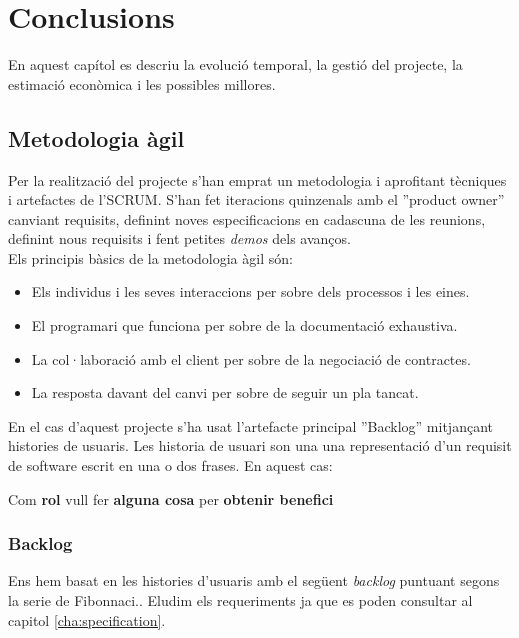 \chapter{Conclusions}
\label{cha:conclussions}

En aquest cap\'{i}tol es descriu la evolució temporal, la gestió del projecte, la estimació econòmica i les possibles millores.


\section{Metodologia àgil}
Per la realització del projecte s'han emprat un metodologia  i aprofitant tècniques i artefactes de l'SCRUM.\cite{agile} S'han fet iteracions quinzenals amb el ''product owner'' canviant requisits, definint noves especificacions en cadascuna de les reunions, definint nous requisits i fent petites \textit{demos} dels avanços.\\
Els principis bàsics de la metodologia àgil són\cite{agilemanifesto}:
\begin{itemize}
\item Els individus i les seves interaccions per sobre dels processos i les eines.
\item El programari que funciona per sobre de la documentació exhaustiva.
\item La col·laboració amb el client per sobre de la negociació de contractes.
\item La resposta davant del canvi per sobre de seguir un pla tancat.
\end{itemize}

En el cas d'aquest projecte s'ha usat l'artefacte principal ''Backlog'' mitjançant histories de usuaris. Les historia de usuari son una una representació d'un requisit de software escrit en una o dos frases. En aquest cas:\\
\centerline{Com \textbf{rol} vull fer \textbf{alguna cosa} per \textbf{obtenir benefici}}

\subsection{Backlog}
Ens hem basat en les histories d'usuaris amb el següent \textit{backlog} puntuant segons la serie de Fibonnaci.\cite{backlogfibonnacci}. Eludim els requeriments ja que es poden consultar al capitol \ref{cha:specification}.

